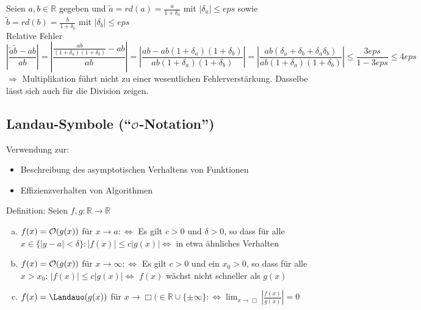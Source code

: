 Seien $ a, b \in \mathbb{R} $ gegeben und
$ \tilde{a} = rd(a) = \frac{a}{1 + \delta_{a}} $ mit $ | \delta_{a} | \leq eps $ sowie
$ \tilde{b} = rd(b) = \frac{b}{1 + \delta_{b}} $ mit $ | \delta_{b} | \leq eps $ \\
Relative Fehler
\begin{equation*}
\left| \frac{\tilde{a}\tilde{b} - a b}{a b} \right| =
\left| \frac{\frac{ab}{(1 + \delta_{a})(1 + \delta_{b})} - ab}{ab}\right| =
\left| \frac{ab - ab(1 + \delta_{a})(1 + \delta_{b})}{ab(1 + \delta_{a})(1 + \delta_{b})} \right| =
\left| \frac{ab(\delta_{a} + \delta_{b} + \delta_{a}\delta_{b})}{ab(1 + \delta_{a})(1 + \delta_{b})} \right| \leq
\frac{3eps}{1 - 3eps} \leq 4eps 
\end{equation*}
$\Rightarrow$ Multiplikation führt nicht zu einer wesentlichen Fehlerverstärkung.
Dasselbe lässt sich auch für die Division zeigen.

\subsection{Landau-Symbole (``$\mathcal{O}$-Notation'')}
Verwendung zur:
\begin{itemize}
  \item Beschreibung des asymptotischen Verhaltens von Funktionen
  \item Effizienzverhalten von Algorithmen
\end{itemize}
Definition: Seien $f,g: \mathbb{R} \to \mathbb{R}$
\begin{enumerate}[(a)]
  \item $f(x) = \mathcal{O}(g(x))$ für $x \to a :\Leftrightarrow$
    Es gilt $c > 0$ und $\delta > 0$, so dass für alle $x \in \{|y - a| < \delta\}: |f(x)| \leq c|g(x)| \Leftrightarrow$ in etwa ähnliches Verhalten
  \item $f(x) = \mathcal{O}(g(x))$ für $x \to \infty :\Leftrightarrow$
    Es gilt $c > 0$ und ein $x_0 > 0$, so dass für alle $x > x_0:\,|f(x)| \leq c|g(x)| \Leftrightarrow$ $f(x)$ wächst nicht schneller als $g(x)$
  \item $f(x) = \Landauo(g(x))$ für $x \to \Box (\in \mathbb{R} \cup \{\pm \infty\} :\Leftrightarrow
    \lim_{x \to \Box}{|\frac{f(x)}{g(x)}|} = 0$
\end{enumerate}

